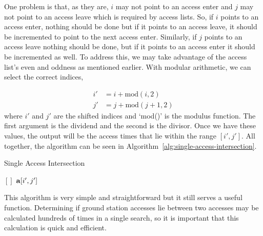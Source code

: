 One problem is that, as they are, $i$ may not point to an access enter and $j$
may not point to an access leave which is required by access lists. So, if $i$
points to an access enter, nothing should be done but if it points to an access
leave, it should be incremented to point to the next access enter. Similarly,
if $j$ points to an access leave nothing should be done, but if it points to an
access enter it should be incremented as well.  To address this, we may take
advantage of the access list's even and oddness as mentioned earlier.  With
modular arithmetic, we can select the correct indices,

\begin{align*}
    i' &= i + \mathrm{mod}(i,2) \\
    j' &= j + \mathrm{mod}(j+1,2)
\end{align*}
where $i'$ and $j'$ are the shifted indices and `mod()' is the modulus
function.  The first argument is the dividend and the second is the divisor.
Once we have these values, the output will be the access times that lie within
the range $[i', j']$. All together, the algorithm can be seen in
Algorithm~\ref{alg:single-access-intersection}.


\begin{algorithm}[h] 
    \caption{Single Access Intersection}
    \label{alg:single-access-intersection} 
    \begin{algorithmic}[1]

	 

	 
	    \EndIf
	    \EndIf
	\EndFor

	 

	    \State \Return $[]$ 
	\Else
	    \State \Return $\bm{\mathrm{a}}[i',j']$ 
	\EndIf
	\EndFunction
    \end{algorithmic}
\end{algorithm}

This algorithm is very simple and straightforward but it still serves a useful
function. Determining if ground station accesses lie between two accesses may
be calculated hundreds of times in a single search, so it is important that
this calculation is quick and efficient.


